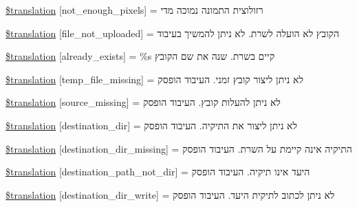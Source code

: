 \begin{DoxyCompactItemize}
\item 
\hyperlink{class_8upload_8he___i_l_8php_a1fe342c27ce61f4ff4e0120ba647033e}{\$translation} \mbox{[}\textquotesingle{}not\+\_\+enough\+\_\+pixels\textquotesingle{}\mbox{]} = \textquotesingle{}רזולוצית התמונה נמוכה מדי\textquotesingle{}
\item 
\hyperlink{class_8upload_8he___i_l_8php_a4ce76e7be0b3a03c2b47f6d70c21832e}{\$translation} \mbox{[}\textquotesingle{}file\+\_\+not\+\_\+uploaded\textquotesingle{}\mbox{]} = \textquotesingle{}הקובץ לא הועלה לשרת. לא ניתן להמשיך בעיבוד\textquotesingle{}
\item 
\hyperlink{class_8upload_8he___i_l_8php_afd84e910217f04139f567c41e292afa5}{\$translation} \mbox{[}\textquotesingle{}already\+\_\+exists\textquotesingle{}\mbox{]} = \textquotesingle{}\%s קיים בשרת. שנה את שם הקובץ\textquotesingle{}
\item 
\hyperlink{class_8upload_8he___i_l_8php_ab0fa87a88aba2624004581eed0633325}{\$translation} \mbox{[}\textquotesingle{}temp\+\_\+file\+\_\+missing\textquotesingle{}\mbox{]} = \textquotesingle{}לא ניתן ליצור קובץ זמני. העיבוד הופסק\textquotesingle{}
\item 
\hyperlink{class_8upload_8he___i_l_8php_aceaaf7355acaaf10f0ae60378d03c468}{\$translation} \mbox{[}\textquotesingle{}source\+\_\+missing\textquotesingle{}\mbox{]} = \textquotesingle{}לא ניתן להעלות קובץ. העיבוד הופסק\textquotesingle{}
\item 
\hyperlink{class_8upload_8he___i_l_8php_aff2427c72a2598aefa6d58df1dd18b08}{\$translation} \mbox{[}\textquotesingle{}destination\+\_\+dir\textquotesingle{}\mbox{]} = \textquotesingle{}לא ניתן ליצור את התיקיה. העיבוד הופסק\textquotesingle{}
\item 
\hyperlink{class_8upload_8he___i_l_8php_a9ef28d3cf09942c6c0a1e77fa09185e8}{\$translation} \mbox{[}\textquotesingle{}destination\+\_\+dir\+\_\+missing\textquotesingle{}\mbox{]} = \textquotesingle{}התיקיה אינה קיימת על השרת. העיבוד הופסק\textquotesingle{}
\item 
\hyperlink{class_8upload_8he___i_l_8php_a5704a67137126e8c87b7a364175929d4}{\$translation} \mbox{[}\textquotesingle{}destination\+\_\+path\+\_\+not\+\_\+dir\textquotesingle{}\mbox{]} = \textquotesingle{}היעד אינו תיקיה. העיבוד הופסק\textquotesingle{}
\item 
\hyperlink{class_8upload_8he___i_l_8php_a97608ea194a616db49141a0e6dee900c}{\$translation} \mbox{[}\textquotesingle{}destination\+\_\+dir\+\_\+write\textquotesingle{}\mbox{]} = \textquotesingle{}לא ניתן לכתוב לתיקית היעד. העיבוד הופסק\textquotesingle{}

\end{DoxyCompactItemize}
